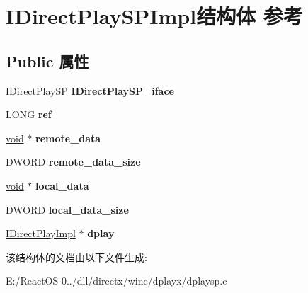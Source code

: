 \hypertarget{struct_i_direct_play_s_p_impl}{}\section{I\+Direct\+Play\+S\+P\+Impl结构体 参考}
\label{struct_i_direct_play_s_p_impl}
\subsection*{Public 属性}
\begin{DoxyCompactItemize}
\item 
\mbox{\label{struct_i_direct_play_s_p_impl_a7ab43429c00505f51928468d5e3c2594}} 
I\+Direct\+Play\+SP {\bfseries I\+Direct\+Play\+S\+P\+\_\+iface}
\item 
\mbox{\label{struct_i_direct_play_s_p_impl_a854e60f8489043446dc9e102286cc726}} 
L\+O\+NG {\bfseries ref}
\item 
\mbox{\label{struct_i_direct_play_s_p_impl_aba12e8b64e33d965537e5c805f29d1a1}} 
\hyperlink{interfacevoid}{void} $\ast$ {\bfseries remote\+\_\+data}
\item 
\mbox{\label{struct_i_direct_play_s_p_impl_ab03215e1df94d9397d651209e2111b0b}} 
D\+W\+O\+RD {\bfseries remote\+\_\+data\+\_\+size}
\item 
\mbox{\label{struct_i_direct_play_s_p_impl_aa15d2cf655692d0924d5cd938db95714}} 
\hyperlink{interfacevoid}{void} $\ast$ {\bfseries local\+\_\+data}
\item 
\mbox{\label{struct_i_direct_play_s_p_impl_a705ad1cc6dac7976c5febbfb815e083b}} 
D\+W\+O\+RD {\bfseries local\+\_\+data\+\_\+size}
\item 
\mbox{\label{struct_i_direct_play_s_p_impl_a427170f9e6786bb75809b1101651e3af}} 
\hyperlink{struct_i_direct_play_impl}{I\+Direct\+Play\+Impl} $\ast$ {\bfseries dplay}
\end{DoxyCompactItemize}


该结构体的文档由以下文件生成\+:\begin{DoxyCompactItemize}
\item 
E\+:/\+React\+O\+S-\/0../dll/directx/wine/dplayx/dplaysp.\+c\end{DoxyCompactItemize}
